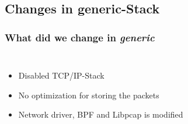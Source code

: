 \documentclass{beamer}
\begin{document}
\subsection*{Changes in generic-Stack}
\begin{frame}
	\frametitle{What did we change in \emph{generic}}
\begin{columns}
\begin{itemize}
	\item <2->Disabled TCP/IP-Stack\newline
	\item <3->No optimization for storing the packets\newline
	\item <4->Network driver, BPF and Libpcap is modified\newline
\end{itemize}
\vspace{-2em}

\end{columns}
\end{frame}
\end{document}
